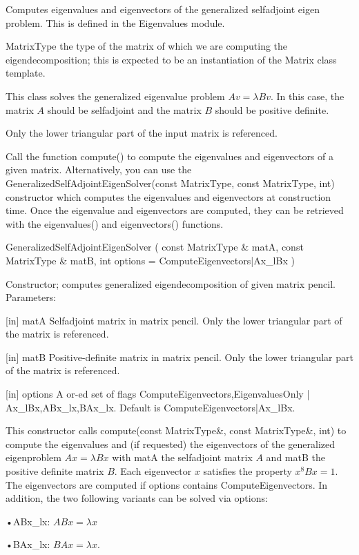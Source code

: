 Computes eigenvalues and eigenvectors of the generalized selfadjoint eigen problem. 
This is defined in the Eigenvalues module.

MatrixType the type of the matrix of which we are computing the eigendecomposition; this is expected to be an instantiation of the Matrix class template. 

This class solves the generalized eigenvalue problem $A v = \lambda B v$. In this case, the matrix $A$ should be selfadjoint and the matrix $B$  should be positive definite.

Only the lower triangular part of the input matrix is referenced.

Call the function compute() to compute the eigenvalues and eigenvectors of a given matrix. Alternatively, you can use the GeneralizedSelfAdjointEigenSolver(const MatrixType, const MatrixType, int) constructor which computes the eigenvalues and eigenvectors at construction time. Once the eigenvalue and eigenvectors are computed, they can be retrieved with the eigenvalues() and eigenvectors() functions.

\vspace{0.3cm}
GeneralizedSelfAdjointEigenSolver  ( const MatrixType \&  matA,    const MatrixType \&  matB,    int  options = ComputeEigenvectors|Ax\_lBx )   

Constructor; computes generalized eigendecomposition of given matrix pencil. 
Parameters:

[in] matA Selfadjoint matrix in matrix pencil. Only the lower triangular part of the matrix is referenced.  

[in] matB Positive-definite matrix in matrix pencil. Only the lower triangular part of the matrix is referenced.  

[in] options A or-ed set of flags {ComputeEigenvectors,EigenvaluesOnly} | {Ax\_lBx,ABx\_lx,BAx\_lx}. Default is ComputeEigenvectors|Ax\_lBx. 

This constructor calls compute(const MatrixType\&, const MatrixType\&, int) to compute the eigenvalues and (if requested) the eigenvectors of the generalized eigenproblem $Ax = \lambda B x$ with matA the selfadjoint matrix $A$ and matB the positive definite matrix $B$. Each eigenvector $x$ satisfies the property $x^8 B x =1$. The eigenvectors are computed if options contains ComputeEigenvectors.
In addition, the two following variants can be solved via options: 

•ABx\_lx: $A B x = \lambda x$

•BAx\_lx: $B A x = \lambda x$.



